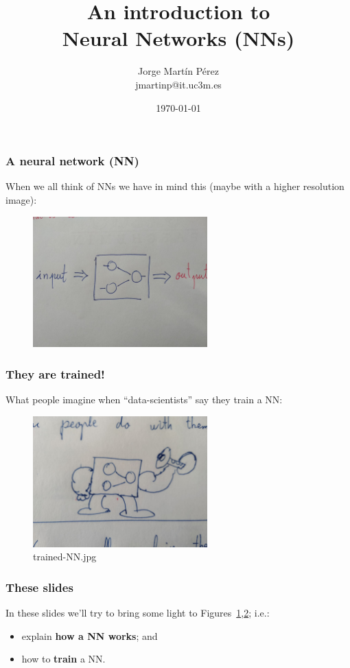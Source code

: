 \documentclass{beamer}
\title{An introduction to\\Neural Networks (NNs)}
\date{\today}
\author{Jorge Martín Pérez\\jmartinp@it.uc3m.es}
\begin{document}
\begin{frame}
\titlepage
\end{frame}

\setcounter{framenumber}{0}


\begin{frame}
    \frametitle{A neural network (NN)}
    When we all think of NNs we have in mind this (maybe with a higher resolution image):
    \begin{figure}
        \centering
        \includegraphics[width=0.6\textwidth]{img/black-box.jpg}
        \caption{}
        \label{fig:black-box}
    \end{figure}
\end{frame}

\begin{frame}
    \frametitle{They are trained!}
    What people imagine when ``data-scientists'' say they train a NN:
    \begin{figure}
        \centering
        \includegraphics[width=0.6\textwidth]{img/trained-nn.jpg}
        \caption{trained-NN.jpg}
        \label{fig:trained-nn}
    \end{figure}
\end{frame}


\begin{frame}
    \frametitle{These slides}
    In these slides we'll try to bring some light to Figures~\ref{fig:black-box},\ref{fig:trained-nn}; i.e.:
    \begin{itemize}
        \item explain \textbf{how a NN works}; and
        \item how to \textbf{train} a NN.
    \end{itemize}
\end{frame}
\end{document}
